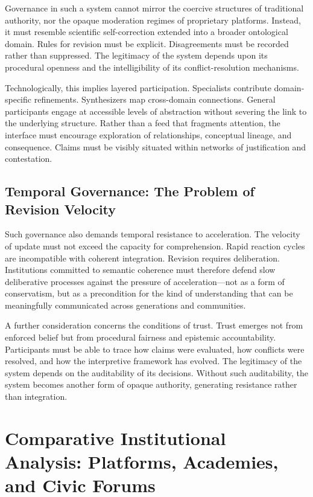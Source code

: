 \documentclass[11pt]{article}
\begin{document}
Governance in such a system cannot mirror the coercive structures of traditional authority, nor the opaque moderation regimes of proprietary platforms. Instead, it must resemble scientific self-correction extended into a broader ontological domain. Rules for revision must be explicit. Disagreements must be recorded rather than suppressed. The legitimacy of the system depends upon its procedural openness and the intelligibility of its conflict-resolution mechanisms.

Technologically, this implies layered participation. Specialists contribute domain-specific refinements. Synthesizers map cross-domain connections. General participants engage at accessible levels of abstraction without severing the link to the underlying structure. Rather than a feed that fragments attention, the interface must encourage exploration of relationships, conceptual lineage, and consequence. Claims must be visibly situated within networks of justification and contestation.

\subsection{Temporal Governance: The Problem of Revision Velocity}

Such governance also demands temporal resistance to acceleration. The velocity of update must not exceed the capacity for comprehension. Rapid reaction cycles are incompatible with coherent integration. Revision requires deliberation. Institutions committed to semantic coherence must therefore defend slow deliberative processes against the pressure of acceleration---not as a form of conservatism, but as a precondition for the kind of understanding that can be meaningfully communicated across generations and communities.

A further consideration concerns the conditions of trust. Trust emerges not from enforced belief but from procedural fairness and epistemic accountability. Participants must be able to trace how claims were evaluated, how conflicts were resolved, and how the interpretive framework has evolved. The legitimacy of the system depends on the auditability of its decisions. Without such auditability, the system becomes another form of opaque authority, generating resistance rather than integration.

\section{Comparative Institutional Analysis: Platforms, Academies, and Civic Forums}
\label{sec:comparative}
\end{document}
